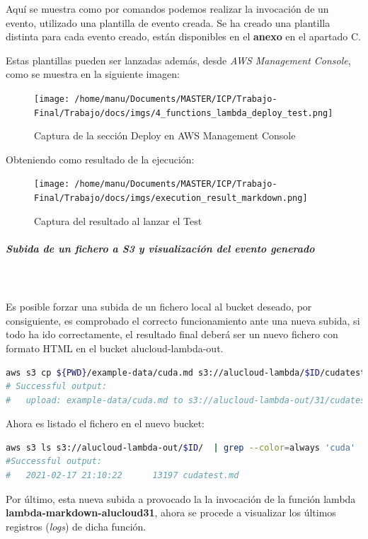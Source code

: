 \documentclass[
]{article}
\begin{document}
Aquí se muestra como por comandos podemos realizar la invocación de un
evento, utilizado una plantilla de evento creada. Se ha creado una
plantilla distinta para cada evento creado, están disponibles en el
\textbf{anexo} en el apartado C.

Estas plantillas pueden ser lanzadas además, desde \textit{AWS Management
Console}, como se muestra en la siguiente imagen:

\begin{figure}[H]
\centering
\texttt{[image: /home/manu/Documents/MASTER/ICP/Trabajo-Final/Trabajo/docs/imgs/4\_functions\_lambda\_deploy\_test.png]}
\caption{Captura de la sección Deploy en AWS Management Console}
\end{figure}

Obteniendo como resultado de la ejecución:

\begin{figure}[H]
\centering
\texttt{[image: /home/manu/Documents/MASTER/ICP/Trabajo-Final/Trabajo/docs/imgs/execution\_result\_markdown.png]}
\caption{Captura del resultado al lanzar el Test}
\end{figure}
\hypertarget{header-n190}{%
\subparagraph{Subida de un fichero a S3 y visualización del evento
generado}\label{header-n190}}
\leavevmode
\\
\\
Es posible forzar una subida de un fichero local al bucket deseado, por consiguiente, es comprobado el correcto funcionamiento ante una nueva subida, si todo ha ido correctamente, el resultado final deberá ser un nuevo fichero con formato HTML en el bucket alucloud-lambda-out. 
\begin{lstlisting}[language=bash,caption={Utilizar cp con aws}]
aws s3 cp ${PWD}/example-data/cuda.md s3://alucloud-lambda/$ID/cudatest.md
# Successful output: 
#   upload: example-data/cuda.md to s3://alucloud-lambda-out/31/cudatest.md
\end{lstlisting}

Ahora es listado el fichero en el nuevo bucket:

\begin{lstlisting}[language=bash,caption={Utilizar ls con aws}]
aws s3 ls s3://alucloud-lambda-out/$ID/  | grep --color=always 'cuda'
#Successful output:
#   2021-02-17 21:10:22      13197 cudatest.md
\end{lstlisting}

Por último, esta nueva subida a provocado la la invocación de la función
lambda \textbf{lambda-markdown-alucloud31}, ahora se procede a
visualizar los últimos registros (\emph{logs}) de dicha función.
\end{document}
